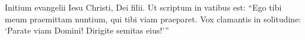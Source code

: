 \documentclass{article}
\newcommand{\bv}[1]{\linenumannotation{#1}}
\begin{document}
  \beginnumbering
  \pstart
    \bv{1}Initium evangelii Iesu Christi, Dei filii.\bv{2} Ut scriptum in vatibus est: “Ego tibi meum praemittam nuntium, qui tibi viam praeparet.\bv{3} Vox clamantis in solitudine: ‘Parate viam Domini! Dirigite semitas eius!’”
  \pend
  \endnumbering
\end{document}
